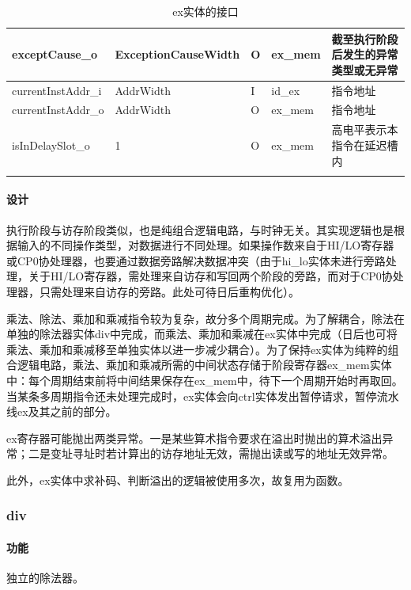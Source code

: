 \documentclass{article}
\begin{document}
\begin{spacing}{1.4}
\begin{longtable}{l|l|l|l|p{5cm}}
\hline exceptCause\_o          & ExceptionCauseWidth    & O     & ex\_mem       & 截至执行阶段后发生的异常类型或无异常 \\
\hline currentInstAddr\_i      & AddrWidth              & I     & id\_ex        & 指令地址 \\
\hline currentInstAddr\_o      & AddrWidth              & O     & ex\_mem       & 指令地址 \\
\hline isInDelaySlot\_o        & 1                      & O     & ex\_mem       & 高电平表示本指令在延迟槽内 \\
\hline
\caption{ex实体的接口}
\label{tb:ex-interface}
\end{longtable}

\paragraph{设计}\mbox{}

执行阶段与访存阶段类似，也是纯组合逻辑电路，与时钟无关。其实现逻辑也是根据输入的不同操作类型，对数据进行不同处理。如果操作数来自于HI/LO寄存器或CP0协处理器，也要通过数据旁路解决数据冲突（由于hi\_lo实体未进行旁路处理，关于HI/LO寄存器，需处理来自访存和写回两个阶段的旁路，而对于CP0协处理器，只需处理来自访存的旁路。此处可待日后重构优化）。

乘法、除法、乘加和乘减指令较为复杂，故分多个周期完成。为了解耦合，除法在单独的除法器实体div中完成，而乘法、乘加和乘减在ex实体中完成（日后也可将乘法、乘加和乘减移至单独实体以进一步减少耦合）。为了保持ex实体为纯粹的组合逻辑电路，乘法、乘加和乘减所需的中间状态存储于阶段寄存器ex\_mem实体中：每个周期结束前将中间结果保存在ex\_mem中，待下一个周期开始时再取回。当某条多周期指令还未处理完成时，ex实体会向ctrl实体发出暂停请求，暂停流水线ex及其之前的部分。

ex寄存器可能抛出两类异常。一是某些算术指令要求在溢出时抛出的算术溢出异常；二是变址寻址时若计算出的访存地址无效，需抛出读或写的地址无效异常。

此外，ex实体中求补码、判断溢出的逻辑被使用多次，故复用为函数。

\subsubsection{div}

\paragraph{功能}\mbox{}

独立的除法器。


\end{spacing}
\end{document}
